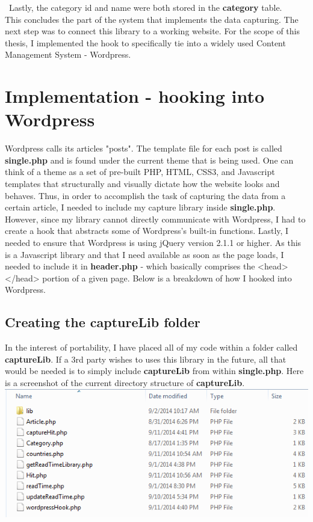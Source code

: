 \documentclass[12pt]{article}
\begin{document}
\noindent\ Lastly, the category id and name were both stored in the \textbf{category} table. \\

This concludes the part of the system that implements the data capturing. The next step was to connect this library to a working website. For the scope of this thesis, I implemented the hook to specifically tie into a widely used Content Management System - Wordpress. 

\vfill

\section{Implementation - hooking into Wordpress}
Wordpress calls its articles "posts". The template file for each post is called \textbf{single.php} and is found under the current theme that is being used. One can think of a theme as a set of pre-built PHP, HTML, CSS3, and Javascript templates that structurally and visually dictate how the website looks and behaves. Thus, in order to accomplish the task of capturing the data from a certain article, I needed to include my capture library inside \textbf{single.php}. However, since my library cannot directly communicate with Wordpress, I had to create a hook that abstracts some of Wordpress's built-in functions. Lastly, I needed to ensure that Wordpress is using jQuery version 2.1.1 or higher. As this is a Javascript library and that I need available as soon as the page loads, I needed to include it in \textbf{header.php} - which basically comprises the <head></head> portion of a given page. Below is a breakdown of how I hooked into Wordpress.
\subsection{Creating the captureLib folder}
In the interest of portability, I have placed all of my code within a folder called \textbf{captureLib}. If a 3rd party wishes to uses this library in the future, all that would be needed is to simply include \textbf{captureLib} from within \textbf{single.php}. Here is a screenshot of the current directory structure of \textbf{captureLib}. \\

\noindent\includegraphics[scale=0.8]{img/capturelib}    
\end{document}

